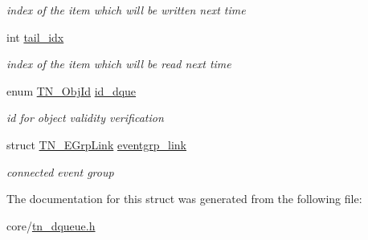 \begin{DoxyCompactItemize}
\begin{DoxyCompactList}\small\item\em index of the item which will be written next time \end{DoxyCompactList}\item 
\hypertarget{structTN__DQueue_ab5451b7c143d4208c36d4227b79732a0}{int \hyperlink{structTN__DQueue_ab5451b7c143d4208c36d4227b79732a0}{tail\+\_\+idx}}\label{structTN__DQueue_ab5451b7c143d4208c36d4227b79732a0}

\begin{DoxyCompactList}\small\item\em index of the item which will be read next time \end{DoxyCompactList}\item 
\hypertarget{structTN__DQueue_afce2b73b8afc3b1537e34ff3a4a7114c}{enum \hyperlink{tn__common_8h_ae779dd1f6735f6e139fb70acd004d976}{T\+N\+\_\+\+Obj\+Id} \hyperlink{structTN__DQueue_afce2b73b8afc3b1537e34ff3a4a7114c}{id\+\_\+dque}}\label{structTN__DQueue_afce2b73b8afc3b1537e34ff3a4a7114c}

\begin{DoxyCompactList}\small\item\em id for object validity verification \end{DoxyCompactList}\item 
\hypertarget{structTN__DQueue_a4c7d686c2f9f6a6bc2f875e1c4849ae1}{struct \hyperlink{structTN__EGrpLink}{T\+N\+\_\+\+E\+Grp\+Link} \hyperlink{structTN__DQueue_a4c7d686c2f9f6a6bc2f875e1c4849ae1}{eventgrp\+\_\+link}}\label{structTN__DQueue_a4c7d686c2f9f6a6bc2f875e1c4849ae1}

\begin{DoxyCompactList}\small\item\em connected event group \end{DoxyCompactList}\end{DoxyCompactItemize}


The documentation for this struct was generated from the following file\+:\begin{DoxyCompactItemize}
\item 
core/\hyperlink{tn__dqueue_8h}{tn\+\_\+dqueue.\+h}\end{DoxyCompactItemize}
